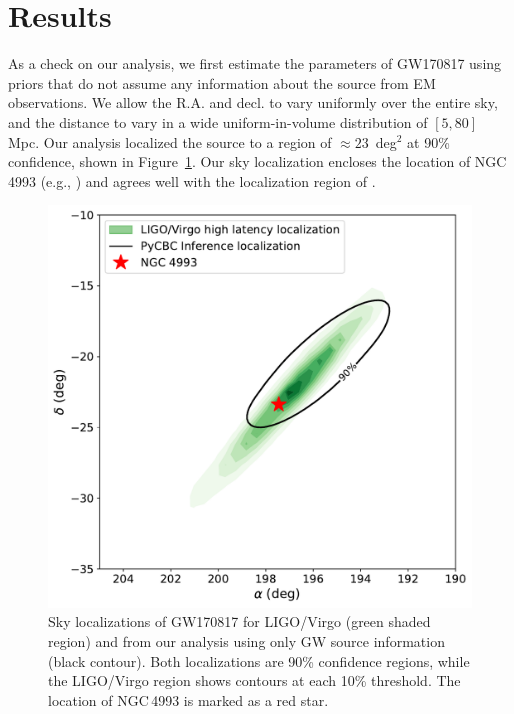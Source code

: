\section{Results} \label{sec:inc_angle_results}

As a check on our analysis, we first estimate the parameters of GW170817 using priors that do not assume any information about the source from EM observations.  We allow the R.A. and decl. to vary uniformly over the entire sky, and the distance to vary in a wide uniform-in-volume distribution of $[5, 80]$ Mpc. Our analysis localized the source to a region of $\approx 23$~deg$^{2}$ at 90\% confidence, shown in Figure~\ref{fig:skyloc}. Our sky localization encloses the location of NGC\,4993 (e.g., \cite{Soares-Santos:2017lru}) and agrees well with the localization region of \cite{TheLIGOScientific:2017qsa}.

\begin{figure}[ht]
\includegraphics[width=\textwidth]{Figures/inc-angle/skyloc_comparison.pdf}
\caption{Sky localizations of GW170817 for LIGO/Virgo (green shaded region) and from our analysis using only GW source information (black contour). Both localizations are 90\% confidence regions, while the LIGO/Virgo region shows contours at each 10\% threshold. The location of NGC\,4993 is marked as a red star.}
\label{fig:skyloc}
\end{figure}

